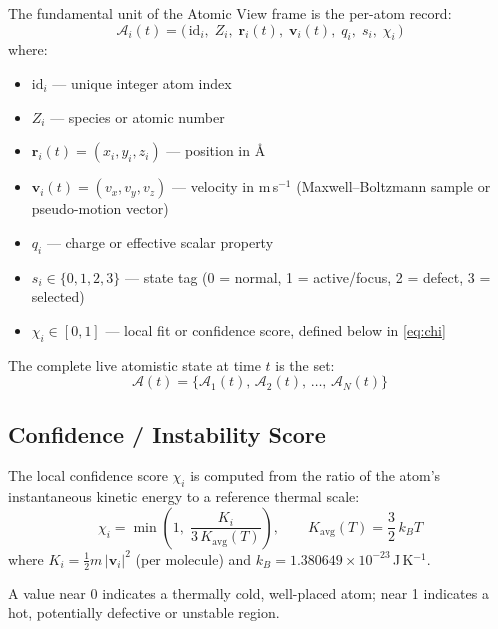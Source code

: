 ﻿\documentclass[11pt]{article}
\begin{document}
The fundamental unit of the Atomic View frame is the per-atom record:
\begin{equation}
  \label{eq:atom_record}
  \mathcal{A}_i(t) =
  \bigl(\,
    \mathrm{id}_i,\;
    Z_i,\;
    \mathbf{r}_i(t),\;
    \mathbf{v}_i(t),\;
    q_i,\;
    s_i,\;
    \chi_i
  \,\bigr)
\end{equation}
where:
\begin{itemize}[noitemsep]
  \item $\mathrm{id}_i$ --- unique integer atom index
  \item $Z_i$ --- species or atomic number
  \item $\mathbf{r}_i(t) = (x_i, y_i, z_i)$ --- position in \AA
  \item $\mathbf{v}_i(t) = (v_x, v_y, v_z)$ --- velocity in m$\,$s$^{-1}$
        (Maxwell--Boltzmann sample or pseudo-motion vector)
  \item $q_i$ --- charge or effective scalar property
  \item $s_i \in \{0,1,2,3\}$ --- state tag
        (0 = normal, 1 = active/focus, 2 = defect, 3 = selected)
  \item $\chi_i \in [0,1]$ --- local fit or confidence score,
        defined below in \eqref{eq:chi}
\end{itemize}

The complete live atomistic state at time $t$ is the set:
\begin{equation}
  \mathcal{A}(t) = \bigl\{\mathcal{A}_1(t),\,\mathcal{A}_2(t),\,\ldots,\,\mathcal{A}_N(t)\bigr\}
\end{equation}

\subsection{Confidence / Instability Score}

The local confidence score $\chi_i$ is computed from the ratio of the atom's
instantaneous kinetic energy to a reference thermal scale:
\begin{equation}
  \label{eq:chi}
  \chi_i = \min\!\left(1,\;
    \frac{K_i}{3\,K_{\mathrm{avg}}(T)}\right),
  \qquad
  K_{\mathrm{avg}}(T) = \frac{3}{2}\,k_B T
\end{equation}
where $K_i = \tfrac{1}{2} m\,|\mathbf{v}_i|^2$ (per molecule) and
$k_B = 1.380649\times10^{-23}$\,J\,K$^{-1}$.

A value near 0 indicates a thermally cold, well-placed atom; near 1 indicates
a hot, potentially defective or unstable region.
\end{document}
